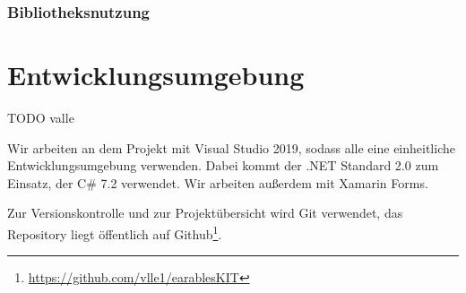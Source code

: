 \documentclass[a4paper,12pt]{article}
\begin{document}
    \subsubsection{Bibliotheksnutzung}


\section{Entwicklungsumgebung}
TODO valle

Wir arbeiten an dem Projekt mit Visual Studio 2019, sodass alle eine einheitliche Entwicklungsumgebung verwenden.
Dabei kommt der .NET Standard 2.0 zum Einsatz, der C\# 7.2 verwendet. Wir arbeiten außerdem mit Xamarin Forms.

Zur Versionskontrolle und zur Projektübersicht wird Git verwendet, das Repository liegt öffentlich auf Github\footnote{\url{https://github.com/vlle1/earablesKIT}}.
\clearpage

\end{document}
